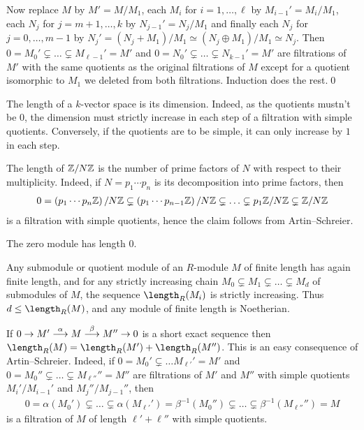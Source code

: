 \documentclass[a4paper,parskip=half,numbers=enddot, DIV=12, headheight=30pt]{scrreprt}
\begin{document}
\begin{rem}
\begin{alphanumerate}
        Now replace $M$ by $M'=M/M_1$, each $M_i$ for $i=1,\ldots,\ell$ by $M_{i-1}'=M_i/M_1$, each $N_j$ for $j= m+1,\ldots,k$ by $N_{j-1}'=N_j/M_1$ and finally each $N_j$ for $j=0,\ldots, m-1$ by $N_j'=(N_j+M_1)/M_1\simeq (N_j\oplus M_1)/M_1\simeq N_j$. Then $0=M_0'\subsetneq\ldots \subsetneq M_{\ell-1}'=M'$ and $0=N_0'\subsetneq \ldots\subsetneq N_{k-1}'=M'$ are filtrations of $M'$ with the same quotients as the original filtrations of $M$ except for a quotient isomorphic to $M_1$ we deleted from both filtrations. Induction does the rest.\qed
    \item 
        The length of a $k$-vector space is its dimension. Indeed, as the quotients mustn't be $0$, the dimension must strictly increase in each step of a filtration with simple quotients. Conversely, if the quotients are to be simple, it can only increase by $1$ in each step.
    \item
        The length of $\mathbb{Z}/N\mathbb{Z}$ is the number of prime factors of $N$ with respect to their multiplicity. Indeed, if $N=p_1\cdots p_n$ is its decomposition into prime factors, then
        \begin{align*}
        	0= \left(p_1\cdots p_n\mathbb{Z}\right)/N\mathbb{Z}\subsetneq \left(p_1\cdots p_{n-1}\mathbb{Z}\right)/N\mathbb{Z}\subsetneq\ldots\subsetneq p_1\mathbb{Z}/N\mathbb{Z}\subsetneq\mathbb{Z}/N\mathbb{Z}
        \end{align*}
        is a filtration with simple quotients, hence the claim follows from Artin--Schreier.
    \item 
        The zero module has length 0.
    \item 
        Any submodule or quotient module of an $R$-module $M$ of finite length has again finite length, and for any strictly increasing chain $M_0\subsetneq M_1\subsetneq\ldots\subsetneq M_d$ of submodules of $M$, the sequence $\length_R(M_i)$ is strictly increasing. Thus $d\leq \length_R(M)$, and any module of finite length is Noetherian.
    \item 
        If $0\morphism M' \morphism[\alpha] M\morphism[\beta] M'' \morphism 0$ is a short exact sequence then $\length_R(M) = \length_R(M') +\length_R(M'')$. This is an easy consequence of Artin--Schreier. Indeed, if $0=M_0'\subsetneq\ldots M_{\ell'}'=M'$ and $0=M_0''\subsetneq\ldots\subsetneq M_{\ell''}''=M''$ are filtrations of $M'$ and $M''$ with simple quotients $M_i'/M_{i-1}'$ and $M_j''/M_{j-1}''$, then 
        \begin{align*}
        	0=\alpha(M_0')\subsetneq\ldots\subsetneq \alpha(M_{\ell'}')=\beta^{-1}(M_0'')\subsetneq\ldots\subsetneq \beta^{-1}(M_{\ell''}'')=M
        \end{align*}
        is a filtration of $M$ of length $\ell'+\ell''$ with simple quotients.
        

\end{alphanumerate}
\end{rem}
\end{document}
